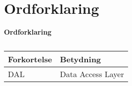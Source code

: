 \section{Ordforklaring}

\bf{Ordforklaring}\\
\begin{table}[H]
\caption{}
\label{tab:}
\begin{tabular}{p{5cm}|p{5cm}}
Forkortelse & Betydning\\
\hline
DAL & Data Access Layer\\
\end{tabular}
\end{table}